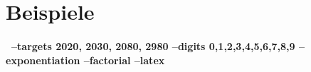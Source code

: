 \documentclass{article}
\theoremstyle{nonumberplain}
\begin{document}
\section{Beispiele}

\paragraph*{~--targets 2020, 2030, 2080, 2980 --digits 0,1,2,3,4,5,6,7,8,9 --exponentiation --factorial --latex~}
\end{document}
